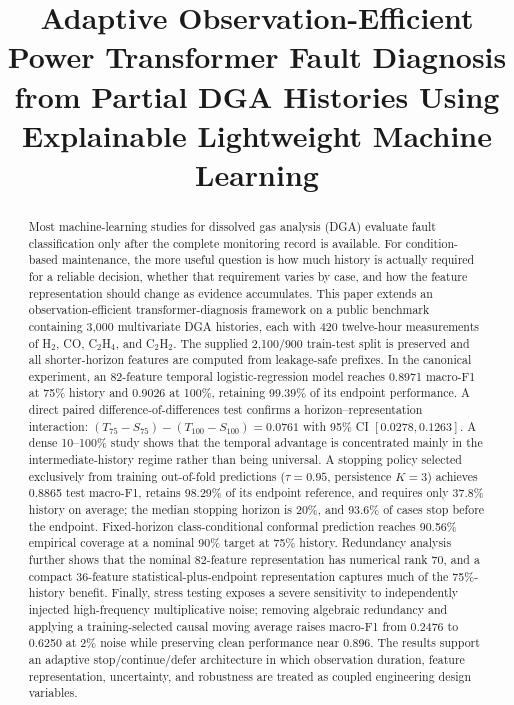 \documentclass[conference]{IEEEtran}
\title{Adaptive Observation-Efficient Power Transformer Fault Diagnosis from Partial DGA Histories Using Explainable Lightweight Machine Learning}
\author{\IEEEauthorblockN{Taufikur Rahman Fuad}
\IEEEauthorblockA{Department of Electrical and Electronic Engineering\\
Islamic University of Technology (IUT)\\
Gazipur, Bangladesh}}
\begin{document}
\maketitle

\begin{abstract}
Most machine-learning studies for dissolved gas analysis (DGA) evaluate fault classification only after the complete monitoring record is available. For condition-based maintenance, the more useful question is how much history is actually required for a reliable decision, whether that requirement varies by case, and how the feature representation should change as evidence accumulates. This paper extends an observation-efficient transformer-diagnosis framework on a public benchmark containing 3,000 multivariate DGA histories, each with 420 twelve-hour measurements of H$_2$, CO, C$_2$H$_4$, and C$_2$H$_2$. The supplied 2,100/900 train-test split is preserved and all shorter-horizon features are computed from leakage-safe prefixes. In the canonical experiment, an 82-feature temporal logistic-regression model reaches 0.8971 macro-F1 at 75\% history and 0.9026 at 100\%, retaining 99.39\% of its endpoint performance. A direct paired difference-of-differences test confirms a horizon--representation interaction: $(T_{75}-S_{75})-(T_{100}-S_{100})=0.0761$ with 95\% CI $[0.0278,0.1263]$. A dense 10--100\% study shows that the temporal advantage is concentrated mainly in the intermediate-history regime rather than being universal. A stopping policy selected exclusively from training out-of-fold predictions ($\tau=0.95$, persistence $K=3$) achieves 0.8865 test macro-F1, retains 98.29\% of its endpoint reference, and requires only 37.8\% history on average; the median stopping horizon is 20\%, and 93.6\% of cases stop before the endpoint. Fixed-horizon class-conditional conformal prediction reaches 90.56\% empirical coverage at a nominal 90\% target at 75\% history. Redundancy analysis further shows that the nominal 82-feature representation has numerical rank 70, and a compact 36-feature statistical-plus-endpoint representation captures much of the 75\%-history benefit. Finally, stress testing exposes a severe sensitivity to independently injected high-frequency multiplicative noise; removing algebraic redundancy and applying a training-selected causal moving average raises macro-F1 from 0.2476 to 0.6250 at 2\% noise while preserving clean performance near 0.896. The results support an adaptive stop/continue/defer architecture in which observation duration, feature representation, uncertainty, and robustness are treated as coupled engineering design variables.
\end{abstract}
\end{document}
